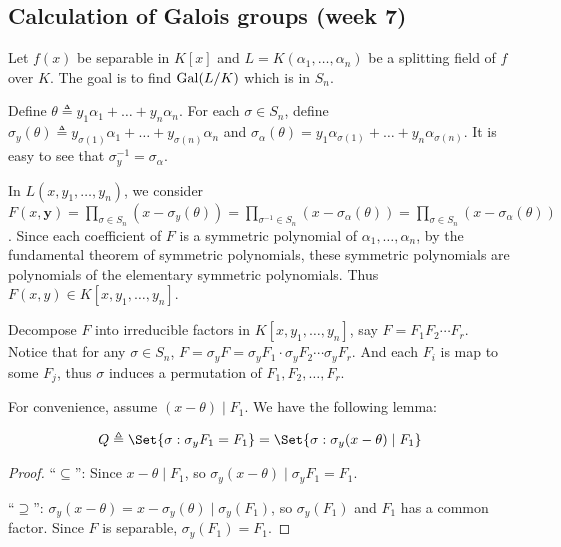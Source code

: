 \subsection{Calculation of Galois groups (week 7)}
Let $f(x)$ be separable in $K[x]$ and $L = K(\alpha_1, \dots, \alpha_n)$ be a splitting field of
$f$ over $K$. The goal is to find $\operatorname{Gal}(L/K)$ which is in $S_n$.

Define $\theta \triangleq y_1 \alpha_1 + \dots + y_n \alpha_n$. For each $\sigma \in S_n$,
define $\sigma_y(\theta) \triangleq y_{\sigma(1)} \alpha_1 + \dots + y_{\sigma(n)} \alpha_n$ and
$\sigma_{\alpha}(\theta) = y_1 \alpha_{\sigma(1)} + \dots + y_n \alpha_{\sigma(n)}$.
It is easy to see that $\sigma_y^{-1} = \sigma_\alpha$. 

In $L(x, y_1, \dots, y_n)$, we consider $F(x, \bm{y})
= \prod\limits_{\sigma \in S_n} (x - \sigma_y(\theta))
= \prod\limits_{\sigma^{-1} \in S_n} (x - \sigma_{\alpha}(\theta))
= \prod\limits_{\sigma \in S_n} (x - \sigma_\alpha(\theta))$.
Since each coefficient of $F$ is a symmetric polynomial of $\alpha_1, \dots, \alpha_n$,
by the fundamental theorem of symmetric polynomials, these symmetric polynomials are
polynomials of the elementary symmetric polynomials. Thus $F(x, y) \in K[x, y_1, \dots, y_n]$.

Decompose $F$ into irreducible factors in $K[x, y_1, \dots, y_n]$, say $F = F_1 F_2 \dotsm F_r$.
Notice that for any $\sigma \in S_n$, $F = \sigma_y F = \sigma_y F_1 \cdot \sigma_y F_2 \dotsm \sigma_y F_r$.
And each $F_i$ is map to some $F_j$, thus $\sigma$ induces a permutation of $F_1, F_2, \dots, F_r$.

For convenience, assume $(x - \theta) \mid F_1$. We have the following lemma:

\begin{lemma}
  \[ Q \triangleq \Set{ \sigma : \sigma_y F_1 = F_1 } = \Set{ \sigma : \sigma_y(x - \theta) \mid F_1} \]
  \begin{proof}
    ``$\subseteq$'': Since $x - \theta \mid F_1$, so $\sigma_y (x - \theta) \mid \sigma_y F_1 = F_1$.

    ``$\supseteq$'': $\sigma_y(x - \theta) = x - \sigma_y(\theta) \mid \sigma_y(F_1)$, so $\sigma_y(F_1)$
    and $F_1$ has a common factor. Since $F$ is separable, $\sigma_y(F_1) = F_1$.
  \end{proof}
\end{lemma}

